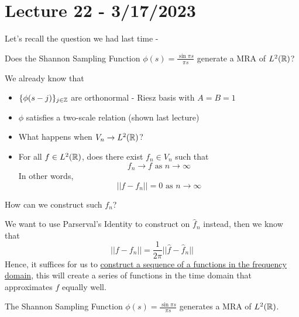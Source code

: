 \documentclass{article}
\begin{document}
\newpage
\section{Lecture 22 - 3/17/2023}

Let's recall the question we had last time -
\begin{question}
    Does the Shannon Sampling Function $\phi(s) = \frac{\sin \pi s}{\pi s}$ generate a MRA of $L^2(\mathbb{R})$?
\end{question}

We already know that
\begin{itemize}
    \item $\{\phi(s - j)\}_{j \in \mathbb{Z}}$ are orthonormal - Riesz basis with $A = B = 1$
    \item $\phi$ satisfies a two-scale relation (shown last lecture)
    \item What happens when $V_n \to L^2(\mathbb{R})$?
    \item For all $f \in L^2(\mathbb{R})$, does there exist $f_n \in V_n$ such that
    \[f_n \to f \text{ as } n \to \infty\]
    In other words,
    \[||f - f_n|| = 0 \text{ as } n \to \infty\]
\end{itemize}

\begin{question}
    How can we construct such $f_n$?
\end{question}

We want to use Parserval's Identity to construct on $\widehat{f}_n$ instead, then we know that
\[||f - f_n|| = \frac{1}{2\pi} ||\widehat{f} - \widehat{f}_n||\]
Hence, it suffices for us to \ul{construct a sequence of a functions in the frequency domain}, this will create a series of functions in the time domain that approximates $f$ equally well.

\begin{theorem}
    The Shannon Sampling Function $\phi(s) = \frac{\sin \pi s}{\pi s}$ generates a MRA of $L^2(\mathbb{R})$.
\end{theorem}
 
\end{document}
